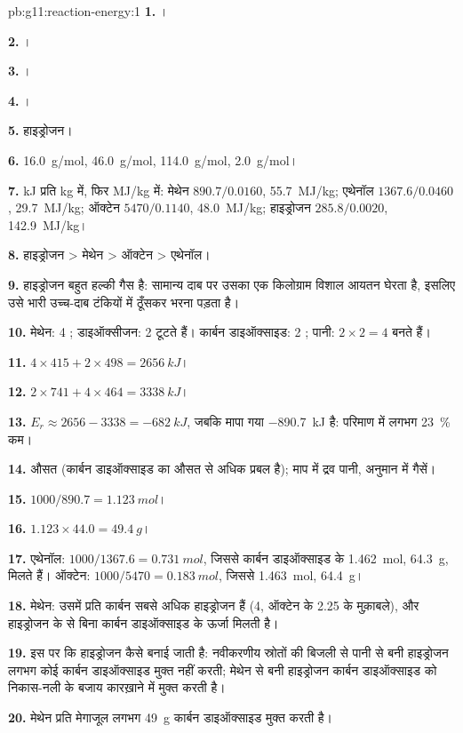 \begin{solution}{pb:g11:reaction-energy:1}
\textbf{1.} ।

\textbf{2.} ।

\textbf{3.} ।

\textbf{4.} ।

\textbf{5.} हाइड्रोजन।

\textbf{6.} \qty{16.0}{g/mol}, \qty{46.0}{g/mol}, \qty{114.0}{g/mol},
\qty{2.0}{g/mol}।

\textbf{7.} \si{kJ} प्रति \si{kg} में, फिर \si{MJ/kg} में: मेथेन
$890.7 / 0.0160$, \qty{55.7}{MJ/kg}; एथेनॉल $1367.6 / 0.0460$,
\qty{29.7}{MJ/kg}; ऑक्टेन $5470 / 0.1140$, \qty{48.0}{MJ/kg}; हाइड्रोजन
$285.8 / 0.0020$, \qty{142.9}{MJ/kg}।

\textbf{8.} हाइड्रोजन > मेथेन > ऑक्टेन > एथेनॉल।

\textbf{9.} हाइड्रोजन बहुत हल्की गैस है: सामान्य दाब पर उसका एक किलोग्राम
विशाल आयतन घेरता है, इसलिए उसे भारी
उच्च-दाब टंकियों में ठूँसकर भरना पड़ता है।

\textbf{10.} मेथेन: 4 ; डाइऑक्सीजन: 2  टूटते हैं। कार्बन
डाइऑक्साइड: 2 ; पानी: $2 \times 2 = 4$  बनते हैं।

\textbf{11.} $4 \times 415 + 2 \times 498 = \qty{2656}{kJ}$।

\textbf{12.} $2 \times 741 + 4 \times 464 = \qty{3338}{kJ}$।

\textbf{13.} $E_r \approx 2656 - 3338 = \qty{-682}{kJ}$, जबकि मापा गया
\qty{-890.7}{kJ} है: परिमाण में लगभग \qty{23}{\percent} कम।

\textbf{14.} औसत  (कार्बन डाइऑक्साइड का 
औसत से अधिक प्रबल है); माप में द्रव पानी, अनुमान में
गैसें।

\textbf{15.} $1000 / 890.7 = \qty{1.123}{mol}$।

\textbf{16.} $1.123 \times 44.0 = \qty{49.4}{g}$।

\textbf{17.} एथेनॉल: $1000 / 1367.6 = \qty{0.731}{mol}$, जिससे
कार्बन डाइऑक्साइड के \qty{1.462}{mol}, \qty{64.3}{g}, मिलते हैं। ऑक्टेन:
$1000 / 5470 = \qty{0.183}{mol}$, जिससे \qty{1.463}{mol}, \qty{64.4}{g}।

\textbf{18.} मेथेन: उसमें प्रति कार्बन  सबसे अधिक हाइड्रोजन  हैं (4,
ऑक्टेन के 2.25 के मुक़ाबले), और हाइड्रोजन के  से बिना कार्बन डाइऑक्साइड के
ऊर्जा मिलती है।

\textbf{19.} इस पर कि हाइड्रोजन कैसे बनाई जाती है: नवीकरणीय स्रोतों की
बिजली से पानी से बनी हाइड्रोजन लगभग कोई कार्बन डाइऑक्साइड मुक्त नहीं करती; मेथेन
से बनी हाइड्रोजन कार्बन डाइऑक्साइड को निकास-नली के बजाय कारख़ाने में
मुक्त करती है।

\textbf{20.} मेथेन प्रति मेगाजूल लगभग \qty{49}{g} कार्बन डाइऑक्साइड
मुक्त करती है।
\end{solution}
